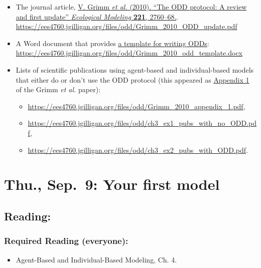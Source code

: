 \documentclass[
]{article}
\providecommand{\tightlist}{%
  \setlength{\itemsep}{0pt}\setlength{\parskip}{0pt}}
\begin{document}
\begin{itemize}
\tightlist
\item
  The journal article, \href{/files/odd/Grimm_2010_ODD_update.pdf}{V.
  Grimm \emph{et al.} (2010). ``The ODD protocol: A review and first
  update'' \emph{Ecological Modeling} \textbf{221}, 2760--68.}.
  \url{https://ees4760.jgilligan.org/files/odd/Grimm_2010_ODD_update.pdf}
\item
  A Word document that provides
  \href{/files/odd/Grimm_2010_odd_template.docx}{a template for writing
  ODDs}:
  \url{https://ees4760.jgilligan.org/files/odd/Grimm_2010_odd_template.docx}
\item
  Lists of scientific publications using agent-based and
  individual-based models that either do or don't use the ODD protocol
  (this appeared as \href{/files/odd/Grimm_2010_appendix_1.pdf}{Appendix
  1} of the Grimm \emph{et al.} paper):

  \begin{itemize}
  \tightlist
  \item
    \url{https://ees4760.jgilligan.org/files/odd/Grimm_2010_appendix_1.pdf},
  \item
    \url{https://ees4760.jgilligan.org/files/odd/ch3_ex1_pubs_with_no_ODD.pdf},
  \item
    \url{https://ees4760.jgilligan.org/files/odd/ch3_ex2_pubs_with_ODD.pdf}.
  \end{itemize}
\end{itemize}

\hypertarget{thu.-sep.-9-your-first-model}{%
\section{Thu., Sep.~9: Your first
model}\label{thu.-sep.-9-your-first-model}}

\hypertarget{reading-4}{%
\subsection{Reading:}\label{reading-4}}

\hypertarget{required-reading-everyone-3}{%
\subsubsection{Required Reading
(everyone):}\label{required-reading-everyone-3}}

\begin{itemize}
\tightlist
\item
  Agent-Based and Individual-Based Modeling, Ch. 4.
\end{itemize}
\end{document}

